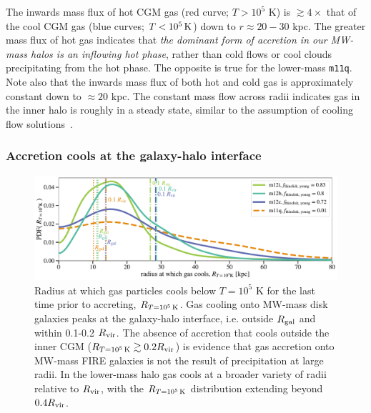 \documentclass[fleqn,usenatbib]{mnras}
\newcommand{\Rcon}{R_{T=10^5\,{\rm K}}}
\begin{document}
The inwards mass flux of hot CGM gas (red curve; $T>10^5$ K)  is $\gtrsim 4\times$ that of the cool CGM gas (blue curves; $T < 10^5\,{\rm K}$) down to $r \approx 20-30$ kpc.
The greater mass flux of hot gas indicates that \textit{the dominant form of accretion in our MW-mass halos is an inflowing hot phase}, rather than cold flows or cool clouds precipitating from the hot phase.
The opposite is true for the lower-mass \texttt{m11q}.
Note also that the inwards mass flux of both hot and cold gas is approximately constant down to $\approx 20$ kpc.
The constant mass flow across radii indicates gas in the inner halo is roughly in a steady state, similar to the assumption of cooling flow solutions~\citep{Stern2019}.

\subsubsection{Accretion cools at the galaxy-halo interface}
\label{s: characteristics -- cools}

\begin{figure}
    \centering
    \includegraphics[width=\textwidth]{figures/R1e5K.pdf}
    \caption{
    Radius at which gas particles cools below $T=10^5$ K for the last time prior to accreting, $\Rcon$.
    Gas cooling onto MW-mass disk galaxies peaks at the galaxy-halo interface, i.e. outside $R_{\rm gal}$ and within 0.1-0.2 $R_{\rm vir}$.
    The absence of accretion that cools outside the inner CGM ($\Rcon \gtrsim 0.2 R_{\rm vir}$) is evidence that gas accretion onto MW-mass FIRE galaxies is not the result of precipitation at large radii.
    In the lower-mass halo gas cools at a broader variety of radii relative to $R_{\rm vir}$, with the $\Rcon$ distribution extending beyond $0.4 R_{\rm vir}$.
    }
    \label{f: R1e5K}
\end{figure}
\end{document}
